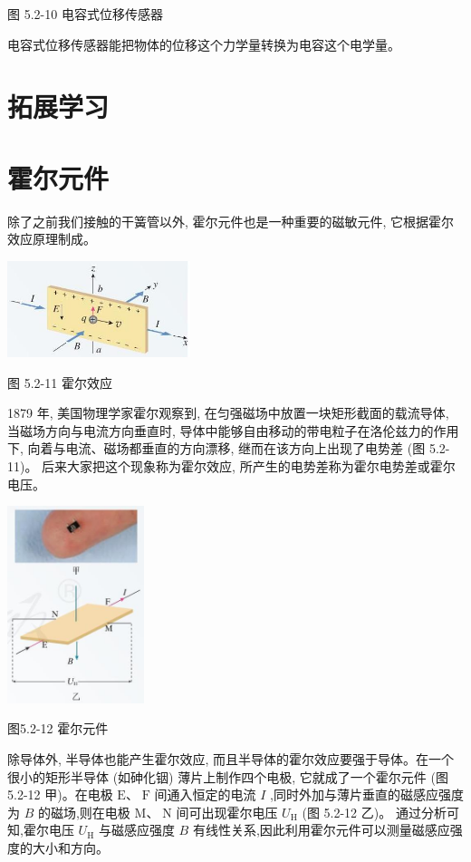\documentclass[10pt]{article}
\begin{document}
图 5.2-10 电容式位移传感器

电容式位移传感器能把物体的位移这个力学量转换为电容这个电学量。

\section*{拓展学习}

\section*{霍尔元件}

除了之前我们接触的干簧管以外, 霍尔元件也是一种重要的磁敏元件, 它根据霍尔效应原理制成。

\begin{center}
\includegraphics[max width=0.4\textwidth]{images/01910e72-c5b7-7ed5-a6d4-fb3a5faefc32_106_247902.jpg}
\end{center}

图 5.2-11 霍尔效应

1879 年, 美国物理学家霍尔观察到, 在匀强磁场中放置一块矩形截面的载流导体, 当磁场方向与电流方向垂直时, 导体中能够自由移动的带电粒子在洛伦兹力的作用下, 向着与电流、磁场都垂直的方向漂移, 继而在该方向上出现了电势差 (图 5.2-11)。 后来大家把这个现象称为霍尔效应, 所产生的电势差称为霍尔电势差或霍尔电压。

\begin{center}
\includegraphics[max width=0.3\textwidth]{images/01910e72-c5b7-7ed5-a6d4-fb3a5faefc32_106_183265.jpg}
\end{center}

图5.2-12 霍尔元件

除导体外, 半导体也能产生霍尔效应, 而且半导体的霍尔效应要强于导体。在一个很小的矩形半导体 (如砷化铟) 薄片上制作四个电极, 它就成了一个霍尔元件 (图 5.2-12 甲)。在电极 \(\mathrm{E}\text{、}\mathrm{\;F}\) 间通入恒定的电流 \(I\) ,同时外加与薄片垂直的磁感应强度为 \(B\) 的磁场,则在电极 \(\mathrm{M}\text{、}\mathrm{\;N}\) 间可出现霍尔电压 \({U}_{\mathrm{H}}\) (图 5.2-12 乙)。 通过分析可知,霍尔电压 \({U}_{\mathrm{H}}\) 与磁感应强度 \(B\) 有线性关系,因此利用霍尔元件可以测量磁感应强度的大小和方向。
\end{document}
